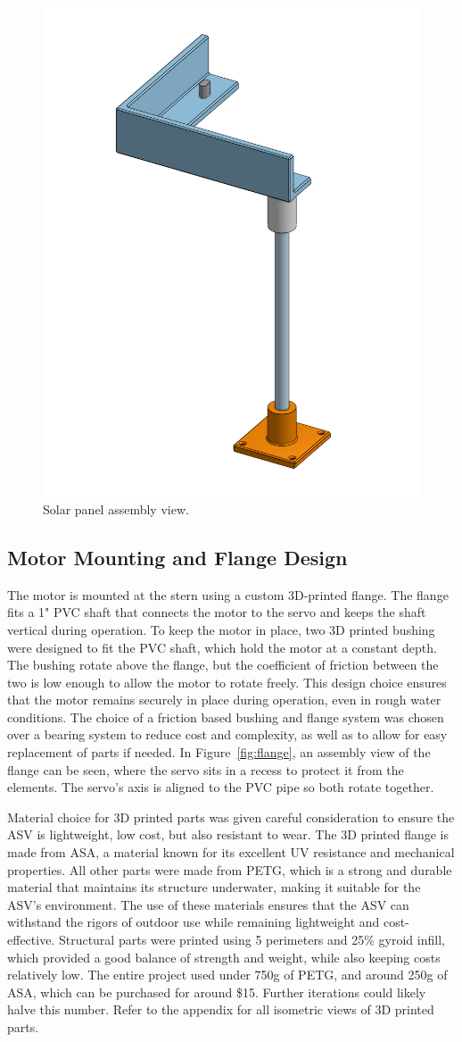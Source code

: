 \begin{figure}[htbp]
  \centering
  \includegraphics[width=0.4\linewidth]{"Solar_Panel_Assembly.png"}
  \caption{Solar panel assembly view.}
  \label{fig:solar-panel}
\end{figure}

\subsection{Motor Mounting and Flange Design}
The motor is mounted at the stern using a custom 3D-printed flange. The flange fits a 1" PVC shaft that connects the motor to the servo and keeps the shaft vertical during operation. To keep the motor in place, two 3D printed bushing were designed to fit the PVC shaft, which hold the motor at a constant depth. The bushing rotate above the flange, but the coefficient of friction between the two is low enough to allow the motor to rotate freely. This design choice ensures that the motor remains securely in place during operation, even in rough water conditions. The choice of a friction based bushing and flange system was chosen over a bearing system to reduce cost and complexity, as well as to allow for easy replacement of parts if needed. In Figure~\ref{fig:flange}, an assembly view of the flange can be seen, where the servo sits in a recess to protect it from the elements. The servo's axis is aligned to the PVC pipe so both rotate together.

Material choice for 3D printed parts was given careful consideration to ensure the ASV is lightweight, low cost, but also resistant to wear. The 3D printed flange is made from ASA, a material known for its excellent UV resistance and mechanical properties. All other parts were made from PETG, which is a strong and durable material that maintains its structure underwater, making it suitable for the ASV's environment. The use of these materials ensures that the ASV can withstand the rigors of outdoor use while remaining lightweight and cost-effective. Structural parts were printed using 5 perimeters and 25\% gyroid infill, which provided a good balance of strength and weight, while also keeping costs relatively low. The entire project used under 750g of PETG, and around 250g of ASA, which can be purchased for around \$15. Further iterations could likely halve this number. Refer to the appendix for all isometric views of 3D printed parts.

